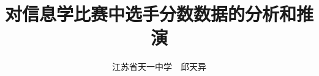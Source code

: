 \documentclass[10pt]{ctexart}
\title{对信息学比赛中选手分数数据的分析和推演}
\author{江苏省天一中学~~邱天异}
\begin{document}
\newtheorem{definition}{\hspace{2em}定义}[section]
\newtheorem{theorem}{\hspace{2em}定理}[section]
\newtheorem{lemma}{\hspace{2em}引理}[section]
\newtheorem{proposition}{\hspace{2em}命题}[section]
\newtheorem{corollary}{\hspace{2em}推论}[section]

\maketitle


\end{document}
